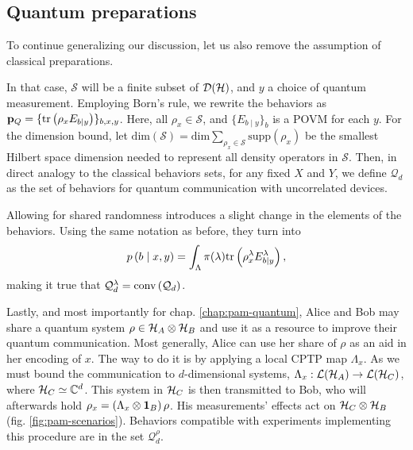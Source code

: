         \subsection{Quantum preparations}

            To continue generalizing our discussion, let us also remove the assumption of classical preparations. 
            
            In that case, $\mathcal{S}$ will be a finite subset of $\mathcal{D}(\mathcal{H})$, and $y$ a choice of quantum measurement. Employing Born's rule, we rewrite the behaviors as $\mathbf{p}_Q = \{ \text{tr}\left( \rho_x E_{b \vert y} \right) \}_{b,x,y}$. Here, all $\rho_x \in \mathcal{S}$, and $\{ E_{b \mid y} \}_b$ is a POVM for each $y$. For the dimension bound, let $\text{dim}(\mathcal{S}) = \text{dim} \sum_{\rho_x \in \mathcal{S}}\text{supp}\left( \rho_x \right)$ be the smallest Hilbert space dimension needed to represent all density operators in $\mathcal{S}$. Then, in direct analogy to the classical behaviors sets, for any fixed $X$ and $Y$, we define $\mathcal{Q}_d$ as the set of behaviors for quantum communication with uncorrelated devices.
            
            Allowing for shared randomness introduces a slight change in the elements of the behaviors. Using the same notation as before, they turn into
            $$
                p \left( b \mid x,y \right) =  \int_\Lambda \pi(\lambda) \text{tr}\left( \rho_x^\lambda E_{b \vert y}^\lambda \right),
            $$
            making it true that $\mathcal{Q}_d^\lambda = \text{conv} \left( \mathcal{Q}_d \right)$.
            
            Lastly, and most importantly for chap. \ref{chap:pam-quantum}, Alice and Bob may share a quantum system $\rho \in \mathcal{H}_A \otimes \mathcal{H}_B$ and use it as a resource to improve their quantum communication. Most generally, Alice can use her share of $\rho$ as an aid in her encoding of $x$. The way to do it is by applying a local CPTP map $\Lambda_x$. As we must bound the communication to $d$-dimensional systems, $\Lambda_x : \mathcal{L}(\mathcal{H}_A) \rightarrow \mathcal{L}(\mathcal{H}_C)$, where $\mathcal{H}_C \simeq \mathbb{C}^d$. This system in $\mathcal{H}_C$ is then transmitted to Bob, who will afterwards hold $\rho_x = \left( \Lambda_x \otimes \mathbf{1}_B \right) \rho$. His measurements' effects act on $\mathcal{H}_C \otimes \mathcal{H}_B$ (fig. \ref{fig:pam-scenarios}). Behaviors compatible with experiments implementing this procedure are in the set $\mathcal{Q}^\rho_{d}$.
            
